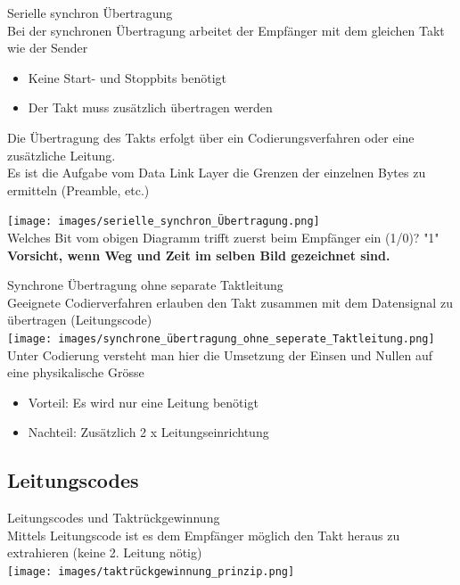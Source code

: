 \columnbreak

\begin{definition}{Serielle synchron Übertragung}\\
    Bei der synchronen Übertragung arbeitet der Empfänger mit dem gleichen Takt wie der Sender
    \begin{itemize}
        \item Keine Start- und Stoppbits benötigt
        \item Der Takt muss zusätzlich übertragen werden
    \end{itemize}
    Die Übertragung des Takts erfolgt über ein Codierungsverfahren oder eine zusätzliche Leitung. \\
    Es ist die Aufgabe vom Data Link Layer die Grenzen der einzelnen Bytes zu ermitteln (Preamble, etc.)
\end{definition}

\begin{example}
    \texttt{[image: images/serielle\_synchron\_Übertragung.png]}\\
    Welches Bit vom obigen Diagramm trifft zuerst beim Empfänger ein (1/0)? "1"\\
    \textbf{Vorsicht, wenn Weg und Zeit im selben Bild gezeichnet sind.}
\end{example}

\begin{concept}{Synchrone Übertragung ohne separate Taktleitung}\\
    Geeignete Codierverfahren erlauben den Takt zusammen mit dem Datensignal zu übertragen (Leitungscode)\\
    \texttt{[image: images/synchrone\_übertragung\_ohne\_seperate\_Taktleitung.png]}\\
    Unter Codierung versteht man hier die Umsetzung der Einsen und Nullen auf eine physikalische Grösse
    \begin{itemize}
        \item Vorteil: Es wird nur eine Leitung benötigt
        \item Nachteil: Zusätzlich 2 x Leitungseinrichtung
    \end{itemize}
\end{concept}


\subsection{Leitungscodes}

\begin{definition}{Leitungscodes und Taktrückgewinnung}\\
    Mittels Leitungscode ist es dem Empfänger möglich den Takt heraus zu extrahieren (keine 2. Leitung nötig)\\
    \texttt{[image: images/taktrückgewinnung\_prinzip.png]}
\end{definition}

